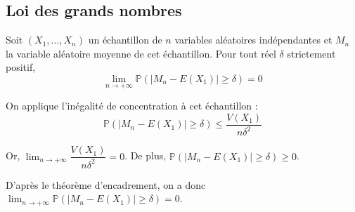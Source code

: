 \documentclass[11pt,fleqn, openany]{book} %
\begin{document}
\subsection{Loi des grands nombres}

\begin{theorem} Soit $(X_1,...,X_n)$ un échantillon de $n$ variables aléatoires indépendantes et $M_n$ la variable aléatoire moyenne de cet échantillon. Pour tout réel $\delta$ strictement positif,
\[ \displaystyle \lim_{n \to + \infty} \mathbb{P}(|M_n-E(X_1)|\geqslant \delta )=0\]\end{theorem}

\begin{demonstration}On applique l'inégalité de concentration à cet échantillon :
\[ \mathbb{P}(|M_n-E(X_1)|\geqslant \delta ) \leqslant \dfrac{V(X_1)}{n\delta^2}\]

Or, $\displaystyle \lim _{n \to + \infty} \dfrac{V(X_1)}{n\delta^2}=0$. De plus, $\mathbb{P}(|M_n-E(X_1)|\geqslant \delta ) \geqslant 0$. 

D'après le théorème d'encadrement, on a donc  $\displaystyle \lim_{n \to + \infty} \mathbb{P}(|M_n-E(X_1)|\geqslant \delta )=0$.\end{demonstration}
\end{document}
